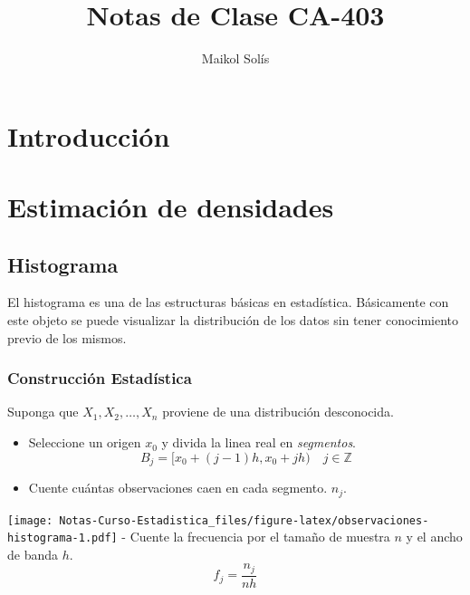 \documentclass[
  12pt,
]{book}
\title{Notas de Clase CA-403}
\author{Maikol Solís}
\date{}
\theoremstyle{definition}
\theoremstyle{definition}
\theoremstyle{definition}
\theoremstyle{remark}
\begin{document}
\maketitle

{
\setcounter{tocdepth}{3}
\tableofcontents
}
\hypertarget{introducciuxf3n}{%
\chapter{Introducción}\label{introducciuxf3n}}

\hypertarget{estimaciuxf3n-de-densidades}{%
\chapter{Estimación de densidades}\label{estimaciuxf3n-de-densidades}}

\hypertarget{histograma}{%
\section{Histograma}\label{histograma}}

El histograma es una de las estructuras básicas en estadística. Básicamente con este objeto se puede visualizar la distribución de los datos sin tener conocimiento previo de los mismos.

\hypertarget{construcciuxf3n-estaduxedstica}{%
\subsection{Construcción Estadística}\label{construcciuxf3n-estaduxedstica}}

Suponga que \(X_1,X_2, \dots ,X_n\) proviene de una distribución desconocida.

\begin{itemize}
\item
  Seleccione un origen \(x_0\) y divida la linea real en \emph{segmentos}.
  \begin{equation*}
  B_j = [x_0 +(j - 1)h,x_0 + jh) \quad j\in \mathbb{Z}
  \end{equation*}
\item
  Cuente cuántas observaciones caen en cada segmento. \(n_j\).
\end{itemize}

\texttt{[image: Notas-Curso-Estadistica\_files/figure-latex/observaciones-histograma-1.pdf]}
- Cuente la frecuencia por el tamaño de muestra \(n\) y el ancho de banda \(h\).
\begin{equation*}
f_j = \frac{n_j}{nh}
\end{equation*}
\end{document}
